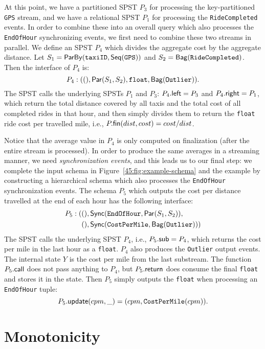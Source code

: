 At this point, we have a partitioned SPST $P_3$ for processing
the key-partitioned \texttt{GPS} stream,
and we have a relational SPST $P_1$ for processing the
\texttt{RideCompleted} events.
In order to combine these into
an overall query
which also processes the \texttt{EndOfHour}
synchronizing events,
we first need to combine these two streams in parallel.
We define an SPST $P_4$ which
divides the aggregate cost by the aggregate distance.
Let $S_1 = \mathsf{ParBy}({\texttt{taxiID}}, \mathsf{Seq}({ \texttt{GPS} }))$
and $S_2 = \mathsf{Bag}({ \texttt{RideCompleted} })$.
Then the interface of $P_4$ is:
\[
P_4: ((), \mathsf{Par}({S_1}, {S_2}), \texttt{float}, \mathsf{Bag}({ \texttt{Outlier} })).
\]
The SPST calls the underlying SPSTs $P_1$ and $P_3$: ${P_4}.{\mathsf{left}} = P_3$ and ${P_4}.{\mathsf{right}} = P_1$, which return the total distance covered by all taxis and the total cost of all completed rides in that hour,
and then simply divides them to return the \texttt{float} ride cost per travelled mile, i.e., ${P}.{\mathsf{fin}}(dist, cost) = cost / dist$.

Notice that the average value in $P_4$
is only computed on finalization (after the entire stream is processed).
In order to produce the same averages in a streaming manner,
we need \emph{synchronization events},
and this leads us to our final step:
we complete the input schema in Figure~\ref{45:fig:example-schema}
and the example by constructing a hierarchical schema
which also processes
the \texttt{EndOfHour} synchronization events.
The schema $P_5$ which outputs the cost per distance travelled
at the end of each hour
has the following interface:
\begin{align*}
P_5: (
    &(), \mathsf{Sync}({ \texttt{EndOfHour} },  \mathsf{Par}({S_1}, {S_2}) ), \\
    &(), \mathsf{Sync}({ \texttt{CostPerMile} },  \mathsf{Bag}({\texttt{Outlier}}) )
)
\end{align*}
The SPST calls the underlying SPST $P_4$, i.e., ${P_5}.{\mathsf{sub}} = P_4$,  which returns the cost per mile in the last hour as a \texttt{float}.
$P_4$ also produces the \texttt{Outlier} output events.
The internal state $Y$ is the cost per mile
from the last substream.
The function ${P_5}.{\mathsf{call}}$
does not pass anything to $P_4$,
but ${P_5}.{\mathsf{return}}$ does consume the final \texttt{float}
and stores it in the state.
Then $P_5$ simply outputs the \texttt{float} when processing an \texttt{EndOfHour} tuple:
\[
{P_5}.{\mathsf{update}}(cpm, \_) = (cpm, \texttt{CostPerMile}(cpm)).
\]

\section{Monotonicity}
\label{45:sec:theorems}

